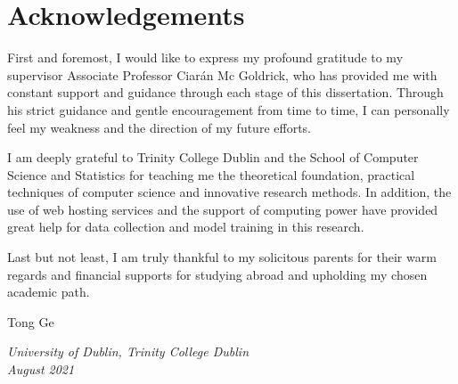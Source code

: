 \chapter*{\Huge{Acknowledgements}}
{
\linespread{1.3}
\selectfont
First and foremost, I would like to express my profound gratitude to my supervisor Associate Professor Ciarán Mc Goldrick, who has provided me with constant support and guidance through each stage of this dissertation. Through his strict guidance and gentle encouragement from time to time, I can personally feel my weakness and the direction of my future efforts.

I am deeply grateful to Trinity College Dublin and the School of Computer Science and Statistics for teaching me the theoretical foundation, practical techniques of computer science and innovative research methods. In addition, the use of web hosting services and the support of computing power have provided great help for data collection and model training in this research.

Last but not least, I am truly thankful to my solicitous parents for their warm regards and financial supports for studying abroad and upholding my chosen academic path.

\vspace{1.2cm}
\begin{flushleft}
Tong Ge

\textit{University of Dublin, Trinity College Dublin \\
August 2021}
\end{flushleft}
}
\clearpage